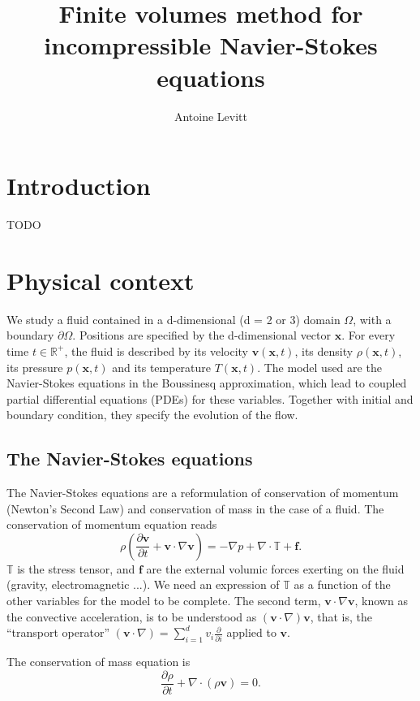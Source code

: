 \documentclass[12pt]{article}
\newcommand{\R}{\mathbb{R}}
\newcommand{\vb}[1]{\ensuremath{\mathbf{#1}}}
\begin{document}
\author{Antoine Levitt}
\title{Finite volumes method for incompressible Navier-Stokes equations}
\maketitle
{}
\tableofcontents
\newpage

\section{Introduction}
TODO
\section{Physical context}
We study a fluid contained in a d-dimensional (d = 2 or 3) domain
$\Omega$, with a boundary $\partial \Omega$. Positions are specified
by the d-dimensional vector \vb{x}. For every time $t \in \R^+$, the
fluid is described by its velocity $\vb{v}(\vb{x}, t)$, its density
$\rho(\vb{x}, t)$, its pressure $p(\vb{x},t)$ and its temperature
$T(\vb{x}, t)$. The model used are the Navier-Stokes equations in the
Boussinesq approximation, which lead to coupled partial differential
equations (PDEs) for these variables. Together with initial and
boundary condition, they specify the evolution of the flow.
\subsection{The Navier-Stokes equations}
The Navier-Stokes equations are a reformulation of conservation of
momentum (Newton's Second Law) and conservation of mass in the case of
a fluid. The conservation of momentum equation reads
\begin{equation}
  \label{ns-mom}
  \rho \left(\frac{\partial \mathbf{v}}{\partial t} + \mathbf{v} \cdot
    \nabla \mathbf{v}\right) = -\nabla p + \nabla \cdot\mathbb{T} +
  \mathbf{f}.
\end{equation}
$\mathbb{T}$ is the stress tensor, and \vb{f} are the external volumic
forces exerting on the fluid (gravity, electromagnetic ...).  We need
an expression of $\mathbb{T}$ as a function of the other variables for
the model to be complete. The second term, $\mathbf{v} \cdot \nabla
\mathbf{v}$, known as the convective acceleration, is to be understood
as $(\vb{v} \cdot \nabla) \vb{v}$, that is, the ``transport operator''
$(\vb{v} \cdot \nabla) = \sum_{i=1}^d v_i \frac{\partial}{\partial i}$
applied to $\vb{v}$.

The conservation of mass equation is
\begin{equation}
  \label{ns-mass}
  \frac{\partial \rho}{\partial t} + \nabla \cdot (\rho \mathbf{v}) = 0.
\end{equation}
\end{document}
